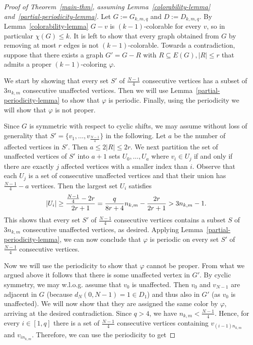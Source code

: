 \documentclass[10pt,a4paper]{amsart}
\renewcommand{\phi}{\ensuremath{\varphi}}
\begin{document}
    \begin{proof}[Proof of Theorem~\ref{main-thm}, assuming Lemma~\ref{colorability-lemma} and~\ref{partial-periodicity-lemma}]
        Let $G := G_{k, m, q}$ and $D := D_{k, m, q}$. By Lemma~\ref{colorability-lemma} $G-v$ is $(k-1)$-colorable for every $v$, so in particular $\chi(G) \leq k$. It is left to show that every graph obtained from $G$ by removing at most $r$ edges is not $(k-1)$-colorable. Towards a contradiction, suppose that there exists a graph $G'=G-R$ with $R\subseteq E(G), |R|\le r$ that admits a proper $(k-1)$-coloring $\phi$.

        We start by showing that every set $S'$ of $\frac{N-1}{4}$ consecutive vertices has a subset of $3n_{k,m}$ consecutive unaffected vertices. Then we will use Lemma~\ref{partial-periodicity-lemma} to show that $\varphi$ is periodic. Finally, using the periodicity we will show that $\varphi$ is not proper.

        Since $G$ is symmetric with respect to cyclic shifts, we may assume without loss of generality that $S' = \{v_1, \dots, v_{\frac{N - 1}{4}}\}$ in the following. Let $a$ be the number of affected vertices in $S'$. Then $a \leq 2|R|\le 2r$. We next partition the set of unaffected vertices of $S'$ into $a + 1$ sets $U_0, \dots, U_{a}$ where $v_i \in U_j$ if and only if there are exactly $j$ affected vertices with a smaller index than $i$. Observe that each $U_j$ is a set of consecutive unaffected vertices and that their union has $\frac{N-1}{4} - a$ vertices. Then the largest set $U_i$ satisfies
        \begin{equation}\notag
            |U_i| \geq \frac{\frac{N - 1}{4} - 2r}{2r + 1} = \frac{q}{8r + 4}n_{k, m} - \frac{2r}{2r + 1} > 3n_{k, m} - 1.
        \end{equation}
        This shows that every set $S'$ of $\frac{N-1}{4}$ consecutive vertices contains a subset $S$ of $3n_{k,m}$ consecutive unaffected vertices, as desired. Applying Lemma~\ref{partial-periodicity-lemma}, we can now conclude that $\varphi$ is periodic on every set $S'$ of $\frac{N-1}{4}$ consecutive vertices.

        Now we will use the periodicity to show that $\varphi$ cannot be proper.
        From what we argued above it follows that there is some unaffected vertex in $G'$. By cyclic symmetry, we may w.l.o.g. assume that $v_0$ is unaffected. Then $v_0$ and $v_{N-1}$ are adjacent in $G$ (because $d_N(0, N-1) = 1 \in D_1$) and thus also in $G'$ (as $v_0$ is unaffected). We will now show that they are assigned the same color by $\varphi$, arriving at the desired contradiction. Since $q > 4$, we have $n_{k, m} < \frac{N - 1}{4}$. Hence, for every $i \in [1, q]$ there is a set of $\frac{N-1}{4}$ consecutive vertices containing $v_{(i-1)n_{k,m}}$ and $v_{in_{k,m}}$. Therefore, we can use the periodicity to get


\end{proof}
\end{document}
